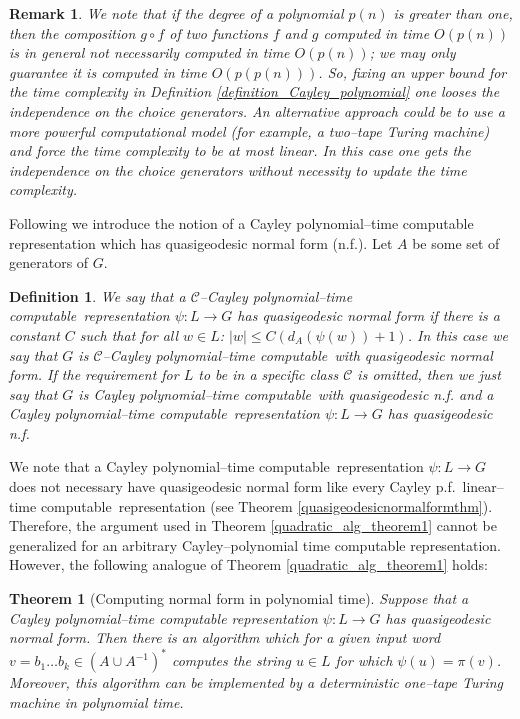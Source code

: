 \documentclass[article,12pt]{elsarticle}
\newtheorem{theorem}{Theorem}
\newtheorem{remark}{Remark}
\newtheorem{definition}{Definition}
\newcommand\linearC{Cayley p.f.~linear--time computable}
\newcommand\CpolyC{$\mathcal{C}$--Cayley polynomial--time computable}
\newcommand\polyC{Cayley polynomial--time computable}
\begin{document}
\begin{remark}
	We note that if the degree of a polynomial 
	$p(n)$ is greater than one, then the 
	composition $g \circ f$ of two functions 
	$f$ and $g$ computed in time $O(p(n))$ is 
	in general not necessarily computed in 
	time $O(p(n))$; we may only guarantee it is 
	computed in time $O(p(p(n)))$. So, 
	fixing an upper bound for the time complexity 
	in Definition \ref{definition_Cayley_polynomial}
	one  looses the independence 
	on the choice generators. An alternative 
	approach could be to use a more powerful 
	computational model (for example, 
	a two--tape Turing machine) and 
	force the time complexity to be at most linear.  
	In this case one gets  
	the independence on the choice generators without
	necessity to update the time complexity.   
\end{remark}	 
Following \cite[Definition~4]{ElderTabackCgraph} 
we introduce the notion of a Cayley polynomial--time 
computable representation which has  quasigeodesic 
normal form (n.f.). Let $A$ be some set of generators of $G$. 
\begin{definition} 
	We say that a \CpolyC\ representation 
	$\psi : L \rightarrow G$ has  quasigeodesic
	normal form if there is a constant $C$ 
	such that for all $w \in L$: 
	$|w| \leqslant C \left(d_A (\psi(w))+1 \right)$. 
	In this case we say that 
	$G$ is  
	\CpolyC\ with quasigeodesic normal form.   
	If the requirement for $L$ to be in a specific 
	class $\mathcal{C}$ is omitted, then we just say
	that $G$ is \polyC\ with quasigeodesic n.f. and 
	a \polyC\ representation $\psi: L \rightarrow G$ has 
    quasigeodesic n.f.
\end{definition}	
We note that a \polyC\
representation $\psi: L \rightarrow G$ does not 
necessary have quasigeodesic normal form 
like every \linearC\ representation
(see Theorem \ref{quasigeodesicnormalformthm}). 
Therefore, the argument used in Theorem 
\ref{quadratic_alg_theorem1} cannot be generalized 
for an arbitrary Cayley--polynomial time computable representation. However, the following  
analogue of Theorem \ref{quadratic_alg_theorem1} 
holds: 
\begin{theorem}[Computing normal form in 
	polynomial time]
	\label{normalform_poltime}	              
	Suppose that a Cayley polynomial--time 
	computable representation $\psi : L \rightarrow G$ 
	has quasigeodesic normal form. 
	Then there is an algorithm 
	which for a given input word 
	$v = b_1\dots b_k \in (A \cup A^{-1})^*$ 
	computes the string $u \in L$ for which 
	$\psi(u) = \pi (v)$. Moreover, this algorithm 
	can be implemented by a deterministic 
	one--tape Turing machine 
	in polynomial time.   
\end{theorem}	
\end{document}
